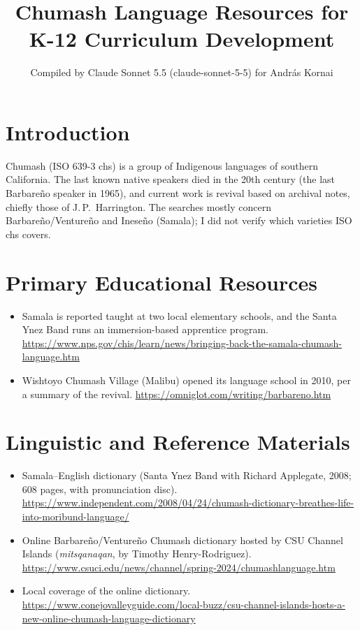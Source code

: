\documentclass[12pt]{article}
\title{Chumash Language Resources for K-12 Curriculum Development}
\author{Compiled by Claude Sonnet 5.5 (claude-sonnet-5-5) for Andr\'as Kornai}
\date{}
\begin{document}
\maketitle

\section{Introduction}
Chumash (ISO 639-3 chs) is a group of Indigenous languages of southern California. The last known native speakers died in the 20th century (the last Barbareño speaker in 1965), and current work is revival based on archival notes, chiefly those of J.\,P.\ Harrington. The searches mostly concern Barbareño/Ventureño and Ineseño (Samala); I did not verify which varieties ISO chs covers.

\section{Primary Educational Resources}
\begin{itemize}
\item Samala is reported taught at two local elementary schools, and the Santa Ynez Band runs an immersion-based apprentice program. \url{https://www.nps.gov/chis/learn/news/bringing-back-the-samala-chumash-language.htm}
\item Wishtoyo Chumash Village (Malibu) opened its language school in 2010, per a summary of the revival. \url{https://omniglot.com/writing/barbareno.htm}
\end{itemize}

\section{Linguistic and Reference Materials}
\begin{itemize}
\item Samala--English dictionary (Santa Ynez Band with Richard Applegate, 2008; 608 pages, with pronunciation disc). \url{https://www.independent.com/2008/04/24/chumash-dictionary-breathes-life-into-moribund-language/}
\item Online Barbareño/Ventureño Chumash dictionary hosted by CSU Channel Islands (\emph{mitsqanaqan}, by Timothy Henry-Rodriguez). \url{https://www.csuci.edu/news/channel/spring-2024/chumashlanguage.htm}
\item Local coverage of the online dictionary. \url{https://www.conejovalleyguide.com/local-buzz/csu-channel-islands-hosts-a-new-online-chumash-language-dictionary}
\end{itemize}
\end{document}
